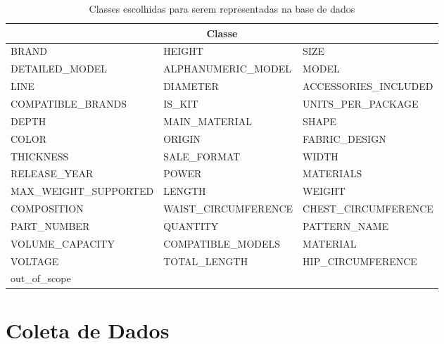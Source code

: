 \begin{table}[ht]
\caption{Classes escolhidas para serem representadas na base de dados}
\label{table:atributos escolhidos}
\tiny %
\begin{tabularx}{\textwidth}{|X|X|X|} 
 \hline
 \multicolumn{3}{|c|}{Classe} \\
 \hline
 BRAND & HEIGHT & SIZE \\ 
 \hline
 DETAILED\_MODEL & ALPHANUMERIC\_MODEL & MODEL \\
 \hline
 LINE & DIAMETER & ACCESSORIES\_INCLUDED \\
 \hline
 COMPATIBLE\_BRANDS & IS\_KIT & UNITS\_PER\_PACKAGE \\
 \hline
 DEPTH & MAIN\_MATERIAL & SHAPE \\
 \hline
 COLOR & ORIGIN & FABRIC\_DESIGN \\
 \hline
 THICKNESS & SALE\_FORMAT & WIDTH \\
 \hline
 RELEASE\_YEAR & POWER & MATERIALS \\
 \hline
 MAX\_WEIGHT\_SUPPORTED & LENGTH & WEIGHT \\
 \hline
 COMPOSITION & WAIST\_CIRCUMFERENCE & CHEST\_CIRCUMFERENCE \\
 \hline
 PART\_NUMBER & QUANTITY & PATTERN\_NAME \\
 \hline
 VOLUME\_CAPACITY & COMPATIBLE\_MODELS & MATERIAL \\
 \hline
 VOLTAGE & TOTAL\_LENGTH & HIP\_CIRCUMFERENCE \\
 \hline
 out\_of\_scope & & \\
 \hline
\end{tabularx}
\end{table}




\section{Coleta de Dados}
\label{coleta_dados}


